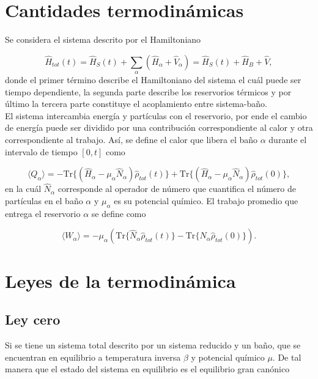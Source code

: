 \section{Cantidades termodinámicas}
Se considera el sistema descrito por el Hamiltoniano

\begin{equation*}
    \hat{H}_{tot}(t) = \hat{H}_{S}(t) + \sum_{\alpha}(\hat{H}_{\alpha} + \hat{V}_{\alpha})  = \hat{H}_{S}(t) + \hat{H}_{B} + \hat{V},
\end{equation*}
donde el primer término describe el Hamiltoniano del sistema el cuál puede ser tiempo dependiente, la segunda parte describe los reservorios térmicos y por último la tercera parte constituye el acoplamiento entre sistema-baño.\\
El sistema intercambia energía y partículas con el reservorio, por ende el cambio de energía puede ser dividido por una contribución correspondiente al calor y otra correspondiente al trabajo. Así, se define el calor que libera el baño $\alpha$ durante el intervalo de tiempo $[0,t]$ como

\begin{equation}
    \langle Q_{\alpha}\rangle = - \text{Tr}\{(\hat{H}_{\alpha} - \mu_{\alpha}\hat{N}_{\alpha})\hat{\rho}_{tot}(t) \} + \text{Tr}\{(\hat{H}_{\alpha} - \mu_{\alpha}\hat{N}_{\alpha})\hat{\rho}_{tot}(0) \},
\label{sec3:calor}
\end{equation}
en la cuál $\hat{N}_{\alpha}$ corresponde al operador de número que cuantifica el número de partículas en el baño $\alpha$ y $\mu_{\alpha}$ es su potencial químico. El trabajo promedio que entrega el reservorio $\alpha$ se define como

\begin{equation}
    \langle W_{\alpha}\rangle = - \mu_{\alpha} (\text{Tr}\{\hat{N}_{\alpha} \hat{\rho}_{tot}(t) \} - \text{Tr}\{\hat{N}_{\alpha}\hat{\rho}_{tot}(0) \}  ).
    \label{sec3:trabajo}
\end{equation}
\label{sec3workheat}

\newpage

\section{Leyes de la termodinámica}
\label{Leyestermo}
\subsection{Ley cero}
Si se tiene un sistema total descrito por un sistema reducido y un baño, que se encuentran en equilibrio a temperatura inversa $\beta$ y potencial químico $\mu$. De tal manera que el estado del sistema en equilibrio es el equilibrio gran canónico

